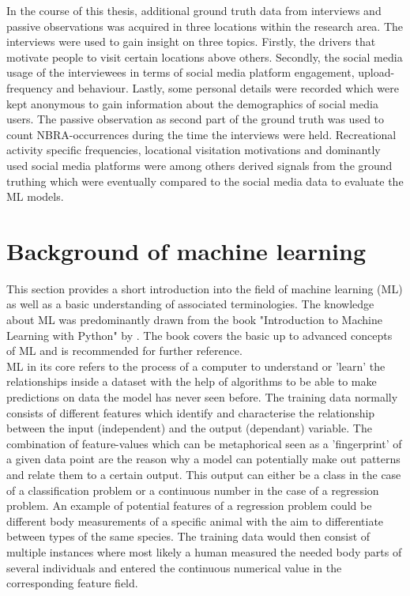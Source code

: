 In the course of this thesis, additional ground truth data from interviews and passive observations was acquired in three locations within the research area. The interviews were used to gain insight on three topics. Firstly, the drivers that motivate people to visit certain locations above others. Secondly, the social media usage of the interviewees in terms of social media platform engagement, upload-frequency and behaviour. Lastly, some personal details were recorded which were kept anonymous to gain information about the demographics of social media users. The passive observation as second part of the ground truth was used to count NBRA-occurrences during the time the interviews were held. Recreational activity specific frequencies, locational visitation motivations and dominantly used social media platforms were among others derived signals from the ground truthing which were eventually compared to the social media data to evaluate the ML models.

\section{Background of machine learning}
This section provides a short introduction into the field of machine learning (ML) as well as a basic understanding of associated terminologies. The knowledge about ML was predominantly drawn from the book "Introduction to Machine Learning with Python" by \textcite{Guido2016}. The book covers the basic up to advanced concepts of ML and is recommended for further reference.\\

ML in its core refers to the process of a computer to understand or 'learn' the relationships inside a dataset with the help of algorithms to be able to make predictions on data the model has never seen before.
The training data normally consists of different features which identify and characterise the relationship between the input (independent) and the output (dependant) variable. The combination of feature-values which can be metaphorical seen as a 'fingerprint' of a given data point are the reason why a model can potentially make out patterns and relate them to a certain output. This output can either be a class in the case of a classification problem or a continuous number in the case of a regression problem.
An example of potential features of a regression problem could be different body measurements of a specific animal with the aim to differentiate between types of the same species. The training data would then consist of multiple instances where most likely a human measured the needed body parts of several individuals and entered the continuous numerical value in the corresponding feature field.\\

